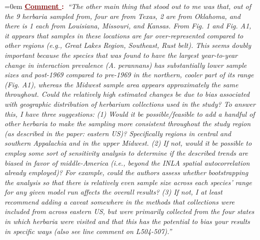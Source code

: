 \documentclass[12pt]{article}
\newcounter{cN}
\newcommand{\comment}[1]{
	\vspace{2em}
	\refstepcounter{cN} %
	\noindent \hangindent=0em \textbf{\textcolor{Maroon}{\uline{Comment \thecN}:~}}\emph{``#1''}
	}
\begin{document}
\comment{The other main thing that stood out to me was that, out of the 9 herbaria sampled from, four are from Texas, 2 are from Oklahoma, and there is 1 each from Louisiana, Missouri, and Kansas. From Fig. 1 and Fig. A1, it appears that samples in these locations are far over-represented compared to other regions (e.g., Great Lakes Region, Southeast, Rust belt). This seems doubly important because the species that was found to have the largest year-to-year change in interaction prevalence (A. perannans) has substantially lower sample sizes and post-1969 compared to pre-1969 in the northern, cooler part of its range (Fig. A1), whereas the Midwest sample area appears approximately the same throughout. Could the relatively high estimated changes be due to bias associated with geographic distribution of herbarium collections used in the study? To answer this, I have three suggestions: (1) Would it be possible/feasible to add a handful of other herbaria to make the sampling more consistent throughout the study region (as described in the paper: eastern US)? Specifically regions in central and southern Appalachia and in the upper Midwest. (2) If not, would it be possible to employ some sort of sensitivity analysis to determine if the described trends are biased in favor of middle-America (i.e., beyond the INLA spatial autocorrelation already employed)? For example, could the authors assess whether bootstrapping the analysis so that there is relatively even sample size across each species’ range for any given model run affects the overall results? (3) If not, I at least recommend adding a caveat somewhere in the methods that collections were included from across eastern US, but were primarily collected from the four states in which herbaria were visited and that this has the potential to bias your results in specific ways (also see line comment on L504-507).}
\end{document}
